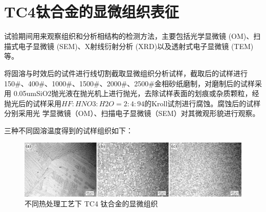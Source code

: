 \section{TC4钛合金的显微组织表征}
试验期间用来观察组织和分析相结构的检测方法，主要包括光学显微镜 (OM)、扫描式电子显微镜 (SEM)、X射线衍射分析 (XRD)以及透射式电子显微镜 (TEM)等。

将固溶与时效后的试件进行线切割截取显微组织分析试样，截取后的试样进行 150\#、400\#、1000\#、1500\#、2000\#、2500\#金相砂纸磨制，对磨制后的试样采用 0.05umSiO2抛光液在抛光机上进行抛光，去除试样表面的划痕或杂质颗粒，经抛光后的试样采用$ HF:HNO3:H2O=2:4:94 $的Kroll试剂进行腐蚀。腐蚀后的试样分别采用光 学显微镜（OM）、扫描电子显微镜（SEM）对其微观形貌进行观察。


三种不同固溶温度得到的试样组织如下：
\begin{figure}[h!]
	\centering
	\includegraphics[width=0.7\linewidth]{pic/demo-mico}
	\caption{不同热处理工艺下 TC4 钛合金的显微组织}
	\label{fig:demo-mico}
\end{figure}